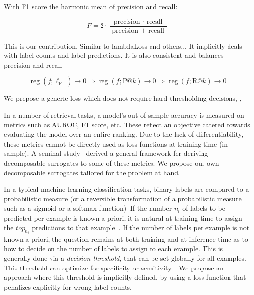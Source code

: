 With F1 score the harmonic mean of precision and recall:

\begin{equation}
F=2 \cdot \frac{\text { precision } \cdot \text { recall }}{\text { precision }+\text { recall }}
\end{equation}


This is our contribution. Similar to lambdaLoss and others... It implicitly deals with label counts and label predictions. It is also consistent and balances precision and recall 

\begin{equation}
\operatorname{reg}\left(f ; \ell_{\mathrm{F_1}}\right) \rightarrow 0 \Longrightarrow \operatorname{reg}\left(f ; \mathrm{P} @ k\right) \rightarrow 0 \Longrightarrow \operatorname{reg}\left(f ; \mathrm{R} @ k\right) \rightarrow 0
\end{equation}

We propose a generic loss which does not require hard thresholding decisions, , 

In a number of retrieval tasks, a model's out of sample accuracy is measured
on metrics such as AUROC, F1 score, etc. These reflect an objective catered
towards evaluating the model over an entire ranking. Due to the lack of
differentiability, these metrics cannot be directly used as loss functions at
training time (in-sample). A seminal study~\cite{optimizableLosses} derived a
general framework for deriving decomposable surrogates to some of these
metrics. We propose our own decomposable surrogates tailored for the problem
at hand.

In a typical machine learning classification tasks, binary labels are compared to a probabilistic measure (or a reversible
transformation of a probabilistic measure such as a sigmoid or a softmax
function). If the number $n_i$ of labels to be predicted per
example is known a priori, it is natural at training time to assign the $top_{n_i}$ predictions
to that example~\cite{lossTopKError, topKmulticlassSVM}. If the number of
labels per example is not known a priori, the question remains at both training and at inference time
as to how to decide on the number of labels to assign to each
example. This is generally done via a \emph{decision threshold}, that can be set globally for all
examples. This threshold can optimize for specificity or
sensitivity~\cite{decisionThreshold}. We propose an approach where this threshold
is implicitly defined, by using a loss function that penalizes explicitly for wrong label counts.



